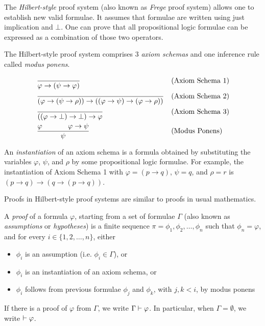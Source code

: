 \documentclass[11pt,usenames, dvipsnames]{article}
\begin{document}
The \emph{Hilbert-style} proof system (also known as \emph{Frege} proof system) allows one to establish new valid formulae. It assumes that formulae are written using just implication and $\bot$. One can prove that all propositional logic formulae can be expressed as a combination of those two operators.

The Hilbert-style proof system comprises 3 \emph{axiom schemas} and one inference rule called \emph{modus ponens}.

\begin{definition}
  \begin{align*}
  &\frac{}{\varphi \to (\psi \to \varphi)} &&\text{(Axiom Schema 1)}
  \\
  &\frac{}{(\varphi \to (\psi \to \rho)) \to ((\varphi \to \psi) \to (\varphi \to \rho))} &&\text{(Axiom Schema 2)}
  \\
  &\frac{}{((\varphi \to \bot) \to \bot) \to \varphi} &&\text{(Axiom Schema 3)}
  \\
  &\frac{\makebox[1.5cm][l]{$\varphi$} \varphi \to \psi}{\psi} &&\text{(Modus Ponens)}
  \end{align*}
\end{definition}

An \emph{instantiation} of an axiom schema is a formula obtained by substituting the variables $\varphi$, $\psi$, and $\rho$ by some propositional logic formulae. For example, the instantiation of Axiom Schema 1 with $\varphi = (p \to q)$, $\psi = q$, and $\rho = r$ is $(p \to q) \to (q \to (p \to q))$.

Proofs in Hilbert-style proof systems are similar to proofs in usual mathematics.

\begin{definition}
  A \emph{proof} of a formula $\varphi$, starting from a set of formulae $\Gamma$ (also known as \emph{assumptions} or \emph{hypotheses}) is a finite sequence $\pi = \phi_1, \phi_2, \ldots, \phi_n$ such that $\phi_n = \varphi$, and for every $i \in \{1, 2, \ldots, n\}$, either
  \begin{itemize}
    \item $\phi_i$ is an assumption (i.e. $\phi_i \in \Gamma$), or
    \item $\phi_i$ is an instantiation of an axiom schema, or
    \item $\phi_i$ follows from previous formulae $\phi_j$ and $\phi_k$, with $j, k < i$, by modus ponens
  \end{itemize}

  If there is a proof of $\varphi$ from $\Gamma$, we write $\Gamma \vdash \varphi$. In particular, when $\Gamma = \emptyset$, we write $\vdash \varphi$.
\end{definition}
\end{document}
